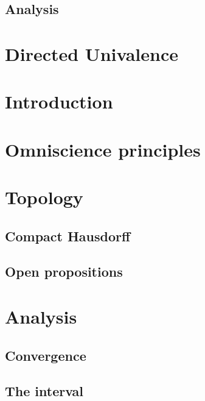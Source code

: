 \documentclass{../util/zariski-small}
\begin{document}
\subsection{Analysis}

\section{Directed Univalence}


%



\appendix
{}
\section*{Introduction}

%

\section{Omniscience principles}


\section{Topology}

\subsection{Compact Hausdorff}



\subsection{Open propositions}


\section{Analysis}

\subsection{Convergence}



\subsection{The interval}
%


\printbibliography
\end{document}
